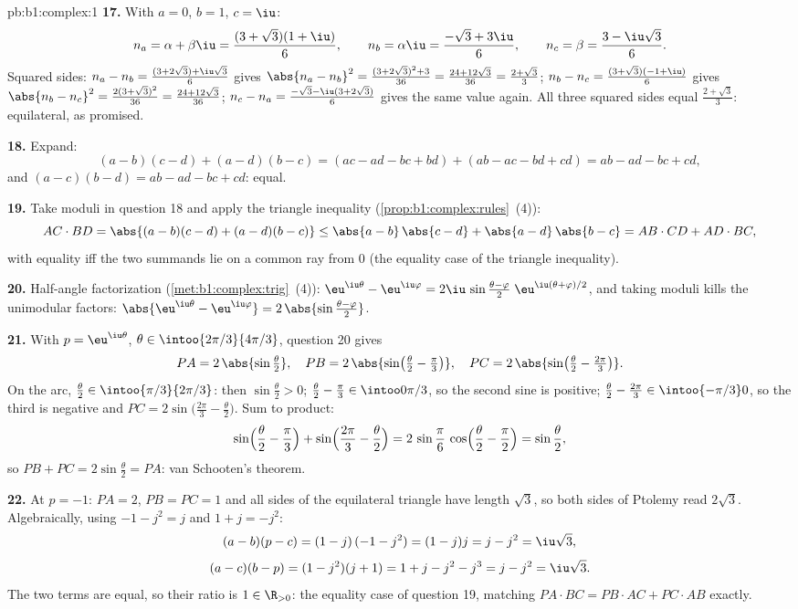 \begin{solution}{pb:b1:complex:1}
\textbf{17.} With $a = 0$, $b = 1$, $c = \iu$:
\[
n_a = \alpha + \beta\iu = \frac{(3 + \sqrt3)(1 + \iu)}6,
\qquad
n_b = \alpha\iu = \frac{-\sqrt3 + 3\iu}6,
\qquad
n_c = \beta = \frac{3 - \iu\sqrt3}6 .
\]
Squared sides: $n_a - n_b = \frac{(3 + 2\sqrt3) +
\iu\sqrt3}6$ gives $\abs{n_a - n_b}^2 = \frac{(3 + 2\sqrt3)^2 +
3}{36} = \frac{24 + 12\sqrt3}{36} = \frac{2 + \sqrt3}3$; $n_b -
n_c = \frac{(3 + \sqrt3)(-1 + \iu)}6$ gives $\abs{n_b - n_c}^2 =
\frac{2(3 + \sqrt3)^2}{36} = \frac{24 + 12\sqrt3}{36}$; $n_c - n_a
= \frac{-\sqrt3 - \iu(3 + 2\sqrt3)}6$ gives the same value again.
All three squared sides equal $\frac{2 + \sqrt3}3$: equilateral,
as promised.

\textbf{18.} Expand:
\[
(a - b)(c - d) + (a - d)(b - c)
= (ac - ad - bc + bd) + (ab - ac - bd + cd)
= ab - ad - bc + cd ,
\]
and $(a - c)(b - d) = ab - ad - bc + cd$: equal.

\textbf{19.} Take moduli in question 18 and apply the triangle
inequality (\cref{prop:b1:complex:rules}~(4)):
\[
AC \cdot BD = \abs{(a-b)(c-d) + (a-d)(b-c)}
\leq \abs{a-b}\,\abs{c-d} + \abs{a-d}\,\abs{b-c}
= AB \cdot CD + AD \cdot BC ,
\]
with equality iff the two summands lie on a common ray from $0$
(the equality case of the triangle inequality).

\textbf{20.} Half-angle factorization
(\cref{met:b1:complex:trig}~(4)):
$\eu^{\iu\theta} - \eu^{\iu\varphi} = 2\iu\,\sin\frac{\theta -
\varphi}2\;\eu^{\iu(\theta + \varphi)/2}$, and taking moduli kills
the unimodular factors: $\abs{\eu^{\iu\theta} - \eu^{\iu\varphi}}
= 2\,\abs{\sin\frac{\theta - \varphi}2}$.

\textbf{21.} With $p = \eu^{\iu\theta}$, $\theta \in
\intoo{2\pi/3}{4\pi/3}$, question 20 gives
\[
PA = 2\,\abs{\sin\tfrac\theta2},
\quad
PB = 2\,\abs{\sin\bigl(\tfrac\theta2 - \tfrac\pi3\bigr)},
\quad
PC = 2\,\abs{\sin\bigl(\tfrac\theta2 - \tfrac{2\pi}3\bigr)} .
\]
On the arc, $\frac\theta2 \in \intoo{\pi/3}{2\pi/3}$: then
$\sin\frac\theta2 > 0$; $\frac\theta2 - \frac\pi3 \in
\intoo0{\pi/3}$, so the second sine is positive; $\frac\theta2 -
\frac{2\pi}3 \in \intoo{-\pi/3}0$, so the third is negative and
$PC = 2\sin\bigl(\frac{2\pi}3 - \frac\theta2\bigr)$. Sum to
product:
\[
\sin\Bigl(\frac\theta2 - \frac\pi3\Bigr) +
\sin\Bigl(\frac{2\pi}3 - \frac\theta2\Bigr)
= 2\,\sin\frac\pi6\,\cos\Bigl(\frac\theta2 - \frac\pi2\Bigr)
= \sin\frac\theta2 ,
\]
so $PB + PC = 2\sin\frac\theta2 = PA$: van Schooten's theorem.

\textbf{22.} At $p = -1$: $PA = 2$, $PB = PC = 1$ and all sides of
the equilateral triangle have length $\sqrt3$, so both sides of
Ptolemy read $2\sqrt3$. Algebraically, using $-1 - j^2 = j$ and
$1 + j = -j^2$:
\[
(a - b)(p - c) = (1 - j)\,(-1 - j^2) = (1 - j)j = j - j^2
= \iu\sqrt3 ,
\]
\[
(a - c)(b - p) = (1 - j^2)(j + 1) = 1 + j - j^2 - j^3
= j - j^2 = \iu\sqrt3 .
\]
The two terms are equal, so their ratio is
$1 \in \R_{>0}$: the equality case of question 19, matching $PA
\cdot BC = PB \cdot AC + PC \cdot AB$ exactly.


\end{solution}
